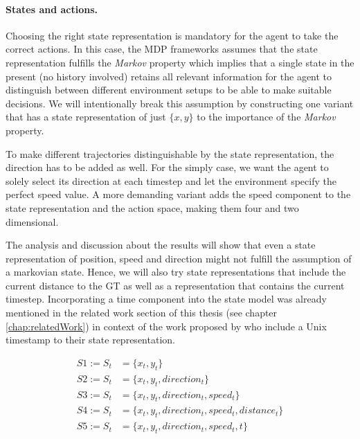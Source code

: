 \paragraph{States and actions.} Choosing the right state representation is mandatory for the agent to take the correct actions. In this case, the MDP frameworks assumes that the state representation fulfills the \textit{Markov} property which implies that a single state in the present (no history involved) retains all relevant information for the agent to distinguish between different environment setups to be able to make suitable decisions. We will intentionally break this assumption by constructing one variant that has a state representation of just $\{x,y\}$ to the importance of the \textit{Markov} property.
\par
To make different trajectories distinguishable by the state representation, the direction has to be added as well. For the simply case, we want the agent to solely select its direction at each timestep and let the environment specify the perfect speed value. A more demanding variant adds the speed component to the state representation and the action space, making them four and two dimensional.
\par
The analysis and discussion about the results will show that even a state representation of position, speed and direction might not fulfill the assumption of a markovian state. Hence, we will also try state representations that include the current distance to the GT as well as a representation that contains the current timestep. Incorporating a time component into the state model was already mentioned in the related work section of this thesis (see chapter \ref{chap:relatedWork}) in context of the work proposed by \cite{liu2019vessel} who include a Unix timestamp to their state representation.

\begin{equation}
\begin{aligned}
    S1 := S_t &= \{x_t,y_t\}
\\
    S2 := S_t &= \{x_t,y_t, direction_t\}
\\
    S3 := S_t &= \{x_t,y_t, direction_t, speed_t\}
\\
    S4 := S_t &= \{x_t,y_t, direction_t, speed_t, distance_t\}
\\
    S5 := S_t &= \{x_t,y_t, direction_t, speed_t, t\}
    \end{aligned}
\end{equation}\label{stateRepresentation}

